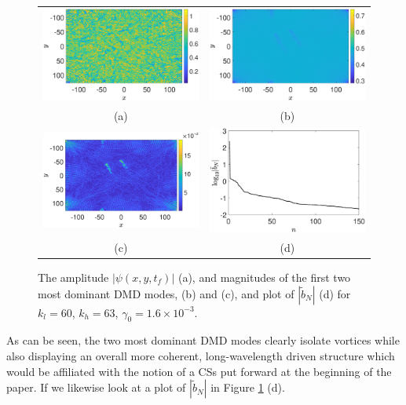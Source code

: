 \documentclass[a4paper,11pt]{article}
\begin{document}
\begin{figure}
\centering
\begin{tabular}{cc}
\includegraphics[width=.51\textwidth]{amplitude_hfforce_K_256_Lx_128_tf_1pt5e4} &\hspace{-15pt} \includegraphics[width=.51\textwidth]{dmd1_amplitude_hfforce_K_256_Lx_128_tf_1pt5e4} \\
(a) & (b)\\
\includegraphics[width=.51\textwidth]{dmd2_amplitude_hfforce_K_256_Lx_128_tf_1pt5e4} &\hspace{-15pt} \includegraphics[width=.51\textwidth]{dmd_mags_hfforce_K_256_Lx_128_tf_1pt5e4}\\
(c) & (d)
\end{tabular}
\caption{The amplitude $\left|\psi(x,y,t_{f})\right|$ (a), and magnitudes of the  first two most dominant DMD modes, (b) and (c), and plot of $\left|\tilde{b}_{N}\right|$ (d) for $k_{l}=60$, $k_{h}=63$, $\gamma_{0}=1.6\times 10^{-3}$. }
\label{fig:ampcomphf}
\end{figure}
As can be seen, the two most dominant DMD modes clearly isolate vortices while also displaying an overall more coherent, long-wavelength driven structure which would be affiliated with the notion of a CSs put forward at the beginning of the paper.  If we likewise look at a plot of $\left|\tilde{b}_{N}\right|$ in Figure \ref{fig:ampcomphf} (d).
\end{document}
